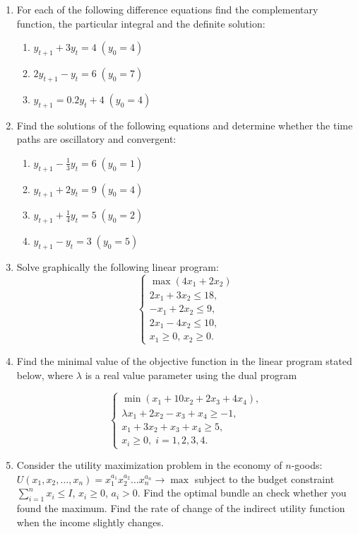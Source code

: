\documentclass[12pt]{article} %
\theoremstyle{definition} %
\begin{document}
\begin{enumerate}
\item For each of the following difference equations find the complementary function, the particular integral and the definite solution:

\begin{enumerate}
\item $y_{t+1}+3y_t=4\; (y_0=4)$
\item $2y_{t+1}-y_t=6\; (y_0=7)$
\item $y_{t+1}=0.2y_t+4\; (y_0=4)$
\end{enumerate}

\item Find the solutions of the following equations and determine whether the time paths are oscillatory and convergent:
\begin{enumerate}
\item $y_{t+1}-\frac13y_t=6\; (y_0=1)$
\item $y_{t+1}+2y_t=9\; (y_0=4)$
\item $y_{t+1}+\frac14y_t=5\; (y_0=2)$
\item $y_{t+1}-y_t=3\; (y_0=5)$
\end{enumerate}

\item Solve graphically the following linear program:
\[
\begin{cases}
\max (4x_1+2x_2)\\
2x_1+3x_2\leq 18,\\
-x_1+2x_2\leq 9,\\
2x_1-4x_2\leq 10,\\
x_1\geq 0,\, x_2\geq 0.
\end{cases}
\]

\item Find the minimal value of the objective function in the linear program stated below, where $\lambda$ is a real value parameter using the dual program

\[
\begin{cases}
\min  (x_1+10 x_2+2x_3+4x_4),\\
\lambda x_1+2x_2-x_3+x_4\geq -1,\\
x_1+3x_2+x_3+x_4\geq 5,\\
x_i\geq 0,\; i=1,2,3,4.
\end{cases}
\]

\item Consider the utility maximization problem in the economy of $n$-goods:\\ $U(x_1,x_2,\dots, x_n)=x_1^{a_1}x_2^{a_2}\dots x_n^{a_n}\rightarrow \max $ subject to the budget constraint $\sum\limits_{i=1}^nx_i\leq I$, $x_i\geq 0$, $a_i>0$.
Find the optimal bundle an check whether you found the maximum. Find the rate of change of the indirect utility function when the income slightly changes.
\end{enumerate}
\end{document}
